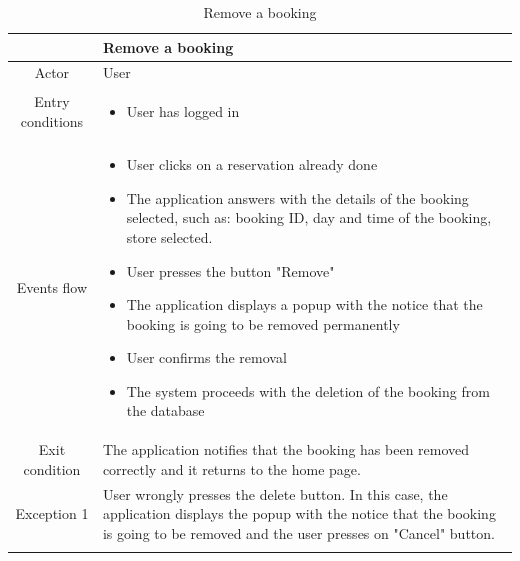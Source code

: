 \documentclass[table, 12pt]{article}
\begin{document}
\begin{longtable}{|c| p{10cm}|}
    \hline
                     & Remove a booking                                                                                                                                                                          \\
    \hline
    Actor            & User                                                                                                                                                                                      \\
    \hline
    Entry conditions & \begin{itemize}
        \item User has logged in
    \end{itemize}                                                                                                                                                                \\
    \hline
    Events flow      & \begin{itemize}[nosep,after=\strut]
        \item User clicks on a reservation already done
        \item The application answers with the details of the booking selected, such as: booking ID, day and time of the booking, store selected.
        \item User presses the button "Remove"
        \item The application displays a popup with the notice that the booking is going to be removed permanently
        \item User confirms the removal
        \item The system proceeds with the deletion of the booking from the database
    \end{itemize}                                                                                                                                                                \\
    \hline
    Exit condition   & The application notifies that the booking has been removed correctly and it returns to the home page.
    \\
    \hline
    \hline
    Exception 1      & User wrongly presses the delete button. In this case, the application displays the popup with the notice that the booking is going to be removed and the user presses on "Cancel" button. \\
    \hline
    \caption{Remove a booking}                                                                                                                                                                                   \\
\end{longtable}
\end{document}
